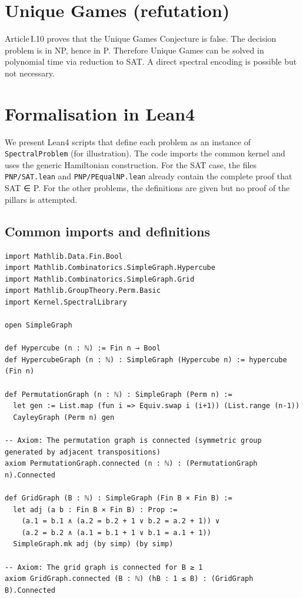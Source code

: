 \documentclass[11pt,a4paper]{article}
\begin{document}
\section{Unique Games (refutation)}

Article I.10 proves that the Unique Games Conjecture is false. The decision problem is in NP, hence in P. Therefore Unique Games can be solved in polynomial time via reduction to SAT. A direct spectral encoding is possible but not necessary.

\section{Formalisation in Lean4}

We present Lean4 scripts that define each problem as an instance of \texttt{SpectralProblem} (for illustration). The code imports the common kernel and uses the generic Hamiltonian construction. For the SAT case, the files \texttt{PNP/SAT.lean} and \texttt{PNP/PEqualNP.lean} already contain the complete proof that SAT ∈ P. For the other problems, the definitions are given but no proof of the pillars is attempted.

\subsection{Common imports and definitions}

\begin{lstlisting}[style=lean, caption={Universality/Common.lean}]
import Mathlib.Data.Fin.Bool
import Mathlib.Combinatorics.SimpleGraph.Hypercube
import Mathlib.Combinatorics.SimpleGraph.Grid
import Mathlib.GroupTheory.Perm.Basic
import Kernel.SpectralLibrary

open SimpleGraph

def Hypercube (n : ℕ) := Fin n → Bool
def HypercubeGraph (n : ℕ) : SimpleGraph (Hypercube n) := hypercube (Fin n)

def PermutationGraph (n : ℕ) : SimpleGraph (Perm n) :=
  let gen := List.map (fun i => Equiv.swap i (i+1)) (List.range (n-1))
  CayleyGraph (Perm n) gen

-- Axiom: The permutation graph is connected (symmetric group generated by adjacent transpositions)
axiom PermutationGraph.connected (n : ℕ) : (PermutationGraph n).Connected

def GridGraph (B : ℕ) : SimpleGraph (Fin B × Fin B) :=
  let adj (a b : Fin B × Fin B) : Prop :=
    (a.1 = b.1 ∧ (a.2 = b.2 + 1 ∨ b.2 = a.2 + 1)) ∨
    (a.2 = b.2 ∧ (a.1 = b.1 + 1 ∨ b.1 = a.1 + 1))
  SimpleGraph.mk adj (by simp) (by simp)

-- Axiom: The grid graph is connected for B ≥ 1
axiom GridGraph.connected (B : ℕ) (hB : 1 ≤ B) : (GridGraph B).Connected
\end{lstlisting}
\end{document}
